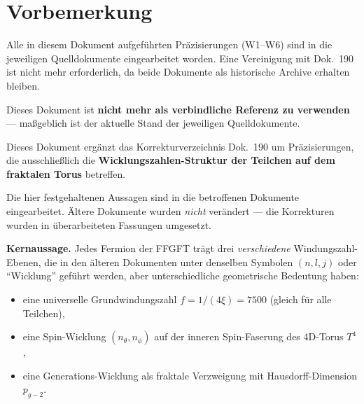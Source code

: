 
\section*{Vorbemerkung}

\begin{tcolorbox}[colback=green!5!white, colframe=green!50!black, title={Status: Vollständig eingearbeitet — Mai 2026}]
Alle in diesem Dokument aufgeführten Präzisierungen (W1–W6) sind in
die jeweiligen Quelldokumente eingearbeitet worden. Eine Vereinigung
mit Dok.~190 ist nicht mehr erforderlich, da beide Dokumente als
historische Archive erhalten bleiben.

Dieses Dokument ist \textbf{nicht mehr als verbindliche Referenz zu
verwenden} — maßgeblich ist der aktuelle Stand der jeweiligen
Quelldokumente.
\end{tcolorbox}

\bigskip

Dieses Dokument ergänzt das Korrekturverzeichnis Dok.~190 um
Präzisierungen, die ausschließlich die \textbf{Wicklungszahlen-Struktur
der Teilchen auf dem fraktalen Torus} betreffen.

Die hier festgehaltenen Aussagen sind in die betroffenen Dokumente
eingearbeitet. Ältere Dokumente wurden \emph{nicht} verändert —
die Korrekturen wurden in überarbeiteten Fassungen umgesetzt.

\bigskip

\textbf{Kernaussage.} Jedes Fermion der FFGFT trägt drei
\emph{verschiedene} Windungszahl-Ebenen, die in den älteren
Dokumenten unter denselben Symbolen $(n,l,j)$ oder \enquote{Wicklung}
geführt werden, aber unterschiedliche geometrische Bedeutung haben:

\begin{itemize}
  \item eine universelle Grundwindungs\-zahl $f = 1/(4\xi) = 7500$
        (gleich für alle Teilchen),
  \item eine Spin-Wicklung $(n_\theta, n_\phi)$ auf der inneren
        Spin-Faserung des 4D-Torus $T^4$,
  \item eine Generations-Wicklung als fraktale Verzweigung mit
        Hausdorff-Dimension $p_{g\!-\!2}$.
\end{itemize}

